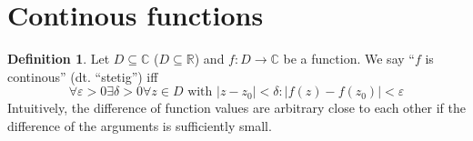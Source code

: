 \documentclass[a4paper,landscape,twocolumn]{article}
\theoremstyle{definition}
\newtheorem{defi}{Definition}
\newcommand\abs[1]{\left|#1\right|}
\begin{document}
\section{Continous functions}
\begin{defi}
  Let $D \subseteq \mathbb C$ ($D \subseteq \mathbb R$) and $f: D \to \mathbb C$
  be a function. We say \enquote{$f$ is continous} (dt. \foreignlanguage{ngerman}{\enquote{stetig}}) iff
  \[
    \forall \varepsilon > 0 \exists \delta > 0
    \forall z \in D \text{ with } \abs{z - z_0} < \delta:
    \abs{f(z) - f(z_0)} < \varepsilon
  \]
  Intuitively, the difference of function values are arbitrary close to each other
  if the difference of the arguments is sufficiently small.
\end{defi}
\end{document}
